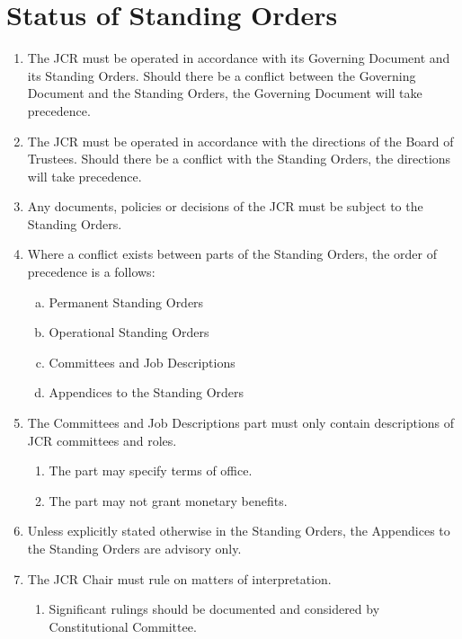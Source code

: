 \documentclass[12pt]{article}
\begin{document}
\section{Status of Standing Orders}
\begin{enumerate}
    \item The JCR must be operated in accordance with its Governing Document and its Standing Orders. Should there be a conflict between the Governing Document and the Standing Orders, the Governing Document will take precedence.
    \item The JCR must be operated in accordance with the directions of the Board of Trustees. Should there be a conflict with the Standing Orders, the directions will take precedence.
    \item Any documents, policies or decisions of the JCR must be subject to the Standing Orders.
    \item Where a conflict exists between parts of the Standing Orders, the order of precedence is a follows:
    \begin{enumerate}[(a)]
        \item Permanent Standing Orders
        \item Operational Standing Orders
        \item Committees and Job Descriptions
        \item Appendices to the Standing Orders
    \end{enumerate}
    \item The Committees and Job Descriptions part must only contain descriptions of JCR committees and roles.
    \begin{enumerate}
        \item The part may specify terms of office.
        \item The part may not grant monetary benefits.
    \end{enumerate}
    \item Unless explicitly stated otherwise in the Standing Orders, the Appendices to the Standing Orders are advisory only.
    \item The JCR Chair must rule on matters of interpretation.
    \begin{enumerate}
        \item Significant rulings should be documented and considered by Constitutional Committee.
    \end{enumerate}
\end{enumerate}
\newpage
\end{document}
